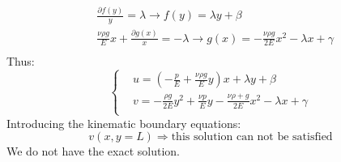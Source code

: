 \begin{equation}
\begin{split}
& \frac{\partial f(y)}{y}=\lambda \rightarrow f(y)=\lambda y+\beta \\
& \frac{\nu \rho g}{E}x + \frac{\partial g(x)}{x} = -\lambda \rightarrow g(x)=-\frac{\nu \rho g}{2E}x^2-\lambda x + \gamma \\
\end{split}
\end{equation}
Thus:
\begin{equation}
\left\lbrace
\begin{split}
& u=\left( -\frac{p}{E}+\frac{\nu \rho g}{E}y \right) x + \lambda y+\beta \\
& v= -\frac{\rho g}{2E}y^2+\frac{\nu p}{E}y -\frac{\nu \rho +  g}{2E}x^2-\lambda x + \gamma \\
\end{split}
\right.
\end{equation}
Introducing the kinematic boundary equations:
\begin{equation}
v(x,y=L) \Rightarrow \text{this solution can not be satisfied}
\end{equation}
We do not have the exact solution.